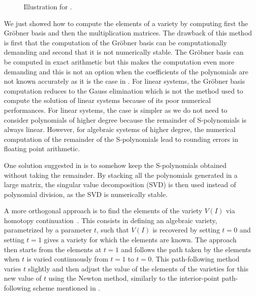 \documentclass[11pt,twoside,a4paper,openright]{uclouvain-thesis}
\begin{document}
\begin{myexem}
\begin{figure}[!ht]
  \centering
  \caption{Illustration for .}
  \label{fig:4normpolar}
\end{figure}

\end{myexem}

We just showed how to compute the elements of a variety by computing
first the Gr\"{o}bner basis and then the multiplication matrices.
The drawback of this method is first that the computation of the Gr\"{o}bner basis
can be computationally demanding and second that it is not numerically stable.
The Gr\"{o}bner basis can be computed in exact arithmetic but this makes the computation
even more demanding and this is not an option when the coefficients of the polynomials
are not known accurately as it is the case in .
For linear systems, the Gr\"{o}bner basis computation reduces to the Gauss elimination
which is not the method used to compute the solution of linear systems
because of its poor numerical performances.
For linear systems, the case is simpler as we do not need to consider polynomials of higher degree because the remainder of S-polynomials is always linear.
However, for algebraic systems of higher degree, the numerical computation of the remainder of the S-polynomials
lead to rounding errors in floating point arithmetic.

One solution suggested in \cite{dreesen2009polynomial} is to somehow keep the S-polynomials obtained without taking the remainder.
By stacking all the polynomials generated in a large matrix, the singular value decomposition (SVD) is then used
instead of polynomial division, as the SVD is numerically stable.

A more orthogonal approach is to find the elements of the variety $V(I)$
via homotopy continuation~\cite{li2003solving,breiding2018homotopycontinuation}.
This consists in defining an algebraic variety,
parametrized by a parameter $t$,
such that $V(I)$ is recovered by setting $t = 0$ and
setting $t = 1$ gives a variety for which the elements are known.
The approach then starts from the elements at $t = 1$ and
follows the path taken by the elements when $t$ is varied continuously from $t = 1$
to $t = 0$.
This path-following method varies $t$ slightly and then adjust the value of the
elements of the varieties for this new value of $t$ using the Newton method,
similarly to the interior-point path-following scheme mentioned in .
\end{document}
